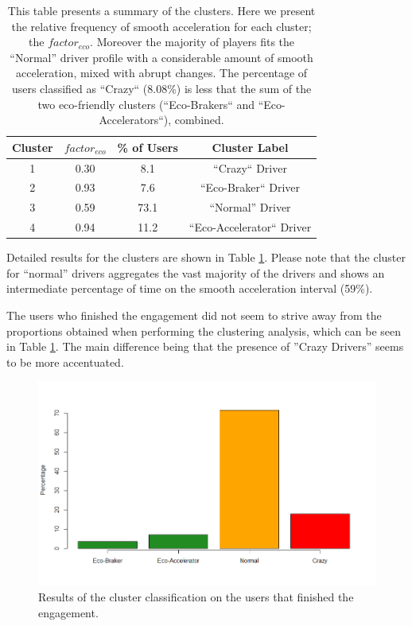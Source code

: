 \documentclass[preprint,authoryear,12pt]{elsarticle}
\begin{document}
\begin{table}[!htb]
	\renewcommand*{\arraystretch}{1.4}
	\caption{This table presents a summary of the clusters. Here we present the relative frequency of smooth acceleration for each cluster; the $factor_{eco}$. Moreover the majority of players fits the ``Normal'' driver profile with a considerable amount of smooth acceleration, mixed with abrupt changes. The percentage of users classified as ``Crazy`` (8.08\%) is less that the sum of the two eco-friendly clusters (``Eco-Brakers`` and ``Eco-Accelerators``), combined. }
	\begin{center}
		\begin{tabular}{c|c|c|c}
			Cluster & $factor_{eco}$ & \% of Users & Cluster Label \\
			\hline
			1 &	 0.30
			& 8.1  & ``Crazy`` Driver  \\
			
			2 & 0.93
			& 7.6  &  ``Eco-Braker`` Driver \\
			
			3 &	 0.59
			& 73.1  &  ``Normal'' Driver  \\
			
			4 & 0.94
			& 11.2  &  ``Eco-Accelerator`` Driver \\
		\end{tabular}
	\end{center}
	\label{T:factors}
\end{table}

Detailed results for the clusters are shown in Table \ref{T:factors}.
Please note that the cluster for ``normal'' drivers aggregates the vast majority of the drivers and shows an intermediate percentage of time on the smooth acceleration interval (59\%).

The users who finished the engagement did not seem to strive away from the proportions obtained when performing the clustering analysis, which can be seen in Table \ref{T:factors}. The main difference being that the presence of ''Crazy Drivers'' seems to be more accentuated.

\begin{figure}[tb]
	\begin{center}
		\includegraphics[width=1\linewidth]{ijhcs14-img/Rplot01}
		\caption{Results of the cluster classification on the users that finished the engagement. \label{fig:clusteringengagement}}
	\end{center}
\end{figure}
\end{document}

